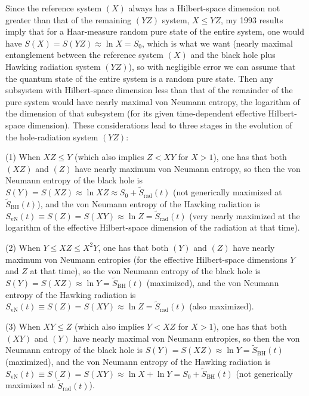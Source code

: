 \documentclass[12pt]{article}
\begin{document}
Since the reference system $(X)$ always has a Hilbert-space dimension not greater than that of the remaining $(YZ)$ system, $X \leq YZ$, my 1993 results \cite{Page:1993df,Page:1993wv} imply that for a Haar-measure random pure state of the entire system, one would have $S(X) = S(YZ) \approx \ln{X} = S_0$, which is what we want (nearly maximal entanglement between the reference system $(X)$ and the black hole plus Hawking radiation system $(YZ)$), so with negligible error we can assume that the quantum state of the entire system is a random pure state.  Then any subsystem with Hilbert-space dimension less than that of the remainder of the pure system would have nearly maximal von Neumann entropy, the logarithm of the dimension of that subsystem (for its given time-dependent effective Hilbert-space dimension).  These considerations lead to three stages in the evolution of the hole-radiation system $(YZ)$:

(1)  When $XZ \leq Y$ (which also implies $Z < XY$ for $X > 1$), one has that both $(XZ)$ and $(Z)$ have nearly maximum von Neumann entropy, so then the von Neumann entropy of the black hole is $S(Y) = S(XZ) \approx \ln{XZ} \approx S_0 + \tilde{S}_\mathrm{rad}(t)$ (not generically maximized at $\tilde{S}_\mathrm{BH}(t)$), and the von Neumann entropy of the Hawking radiation is $S_\mathrm{vN}(t) \equiv S(Z) = S(XY) \approx \ln{Z} = \tilde{S}_\mathrm{rad}(t)$ (very nearly maximized at the logarithm of the effective Hilbert-space dimension of the radiation at that time).

(2)  When $Y \leq XZ \leq X^2Y$, one has that both $(Y)$ and $(Z)$ have nearly maximum von Neumann entropies (for the effective Hilbert-space dimensions $Y$ and $Z$ at that time), so the von Neumann entropy of the black hole is $S(Y) = S(XZ) \approx \ln{Y} = \tilde{S}_\mathrm{BH}(t)$ (maximized), and the von Neumann entropy of the Hawking radiation is $S_\mathrm{vN}(t) \equiv S(Z) = S(XY) \approx \ln{Z} = \tilde{S}_\mathrm{rad}(t)$ (also maximized).

(3)  When $XY \leq Z$ (which also implies $Y < XZ$ for $X > 1$), one has that both $(XY)$ and $(Y)$ have nearly maximal von Neumann entropies, so then the von Neumann entropy of the black hole is $S(Y) = S(XZ) \approx \ln{Y} = \tilde{S}_\mathrm{BH}(t)$ (maximized), and the von Neumann entropy of the Hawking radiation is $S_\mathrm{vN}(t) \equiv S(Z) = S(XY) \approx \ln{X} + \ln{Y} = S_0 + \tilde{S}_\mathrm{BH}(t)$ (not generically maximized at $\tilde{S}_\mathrm{rad}(t)$).
\end{document}

